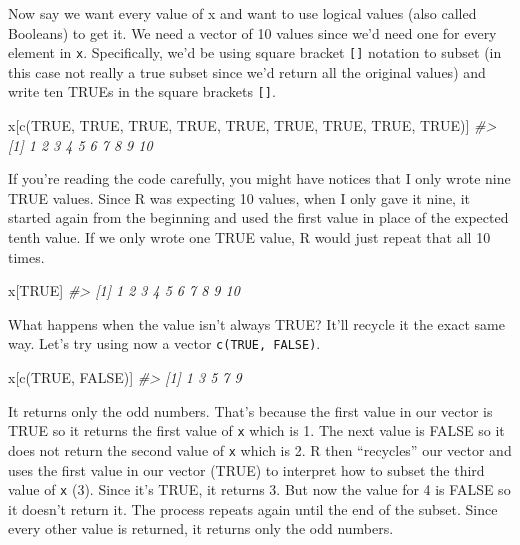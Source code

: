 \documentclass[
]{krantz}
\makeatletter
\newenvironment{Shaded}{\begin{snugshade}}{\end{snugshade}}
\newcommand{\CommentTok}[1]{\textcolor[rgb]{0.37,0.37,0.37}{\textit{#1}}}
\newcommand{\ConstantTok}[1]{\textcolor[rgb]{0,0,0}{#1}}
\newcommand{\FunctionTok}[1]{\textcolor[rgb]{0,0,0}{#1}}
\newcommand{\NormalTok}[1]{#1}
\newenvironment{kframe}{%
\medskip{}
\setlength{\fboxsep}{.8em}
 \def\at@end@of@kframe{}%
 \ifinner\ifhmode%
  \def\at@end@of@kframe{\end{minipage}}%
  \begin{minipage}{\columnwidth}%
 \fi\fi%
 \def\FrameCommand##1{\hskip\@totalleftmargin \hskip-\fboxsep
 \colorbox{shadecolor}{##1}\hskip-\fboxsep
     \hskip-\linewidth \hskip-\@totalleftmargin \hskip\columnwidth}%
 \MakeFramed {\advance\hsize-\width
   \@totalleftmargin\z@ \linewidth\hsize
   \@setminipage}}%
 {\par\unskip\endMakeFramed%
 \at@end@of@kframe}
\renewenvironment{Shaded}{\begin{kframe}}{\end{kframe}}
\makeatother
\begin{document}
Now say we want every value of x and want to use logical values (also called Booleans) to get it. We need a vector of 10 values since we'd need one for every element in \texttt{x}. Specifically, we'd be using square bracket \texttt{{[}{]}} notation to subset (in this case not really a true subset since we'd return all the original values) and write ten TRUEs in the square brackets \texttt{{[}{]}}.

\begin{Shaded}
\begin{Highlighting}[]
\NormalTok{x[}\FunctionTok{c}\NormalTok{(}\ConstantTok{TRUE}\NormalTok{, }\ConstantTok{TRUE}\NormalTok{, }\ConstantTok{TRUE}\NormalTok{, }\ConstantTok{TRUE}\NormalTok{, }\ConstantTok{TRUE}\NormalTok{, }\ConstantTok{TRUE}\NormalTok{, }\ConstantTok{TRUE}\NormalTok{, }\ConstantTok{TRUE}\NormalTok{, }\ConstantTok{TRUE}\NormalTok{)]}
\CommentTok{\#\textgreater{}  [1]  1  2  3  4  5  6  7  8  9 10}
\end{Highlighting}
\end{Shaded}

If you're reading the code carefully, you might have notices that I only wrote nine TRUE values. Since R was expecting 10 values, when I only gave it nine, it started again from the beginning and used the first value in place of the expected tenth value. If we only wrote one TRUE value, R would just repeat that all 10 times.

\begin{Shaded}
\begin{Highlighting}[]
\NormalTok{x[}\ConstantTok{TRUE}\NormalTok{]}
\CommentTok{\#\textgreater{}  [1]  1  2  3  4  5  6  7  8  9 10}
\end{Highlighting}
\end{Shaded}

What happens when the value isn't always TRUE? It'll recycle it the exact same way. Let's try using now a vector \texttt{c(TRUE,\ FALSE)}.

\begin{Shaded}
\begin{Highlighting}[]
\NormalTok{x[}\FunctionTok{c}\NormalTok{(}\ConstantTok{TRUE}\NormalTok{, }\ConstantTok{FALSE}\NormalTok{)]}
\CommentTok{\#\textgreater{} [1] 1 3 5 7 9}
\end{Highlighting}
\end{Shaded}

It returns only the odd numbers. That's because the first value in our vector is TRUE so it returns the first value of \texttt{x} which is 1. The next value is FALSE so it does not return the second value of \texttt{x} which is 2. R then ``recycles'' our vector and uses the first value in our vector (TRUE) to interpret how to subset the third value of \texttt{x} (3). Since it's TRUE, it returns 3. But now the value for 4 is FALSE so it doesn't return it. The process repeats again until the end of the subset. Since every other value is returned, it returns only the odd numbers.
\end{document}
